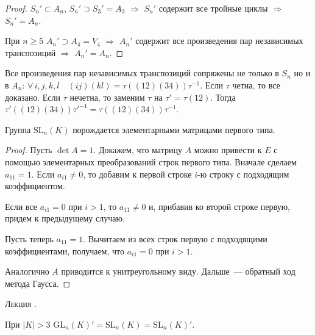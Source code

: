 \documentclass[a4paper]{article}
\newcounter{lec}
\renewcommand{\thelec}{\Roman{lec}}
\newcommand*{\lecture}[1]{\refstepcounter{lec}\vspace{20pt}
\begin{center}{\rmfamily\textsc{Лекция \thelec. \\ \textbf{#1}}}\vspace{5pt}
\end{center}}
\begin{document}
\begin{proof}
$S_n'\subset A_n$, $S_n'\supset S_3'=A_3$ $\Rightarrow$ $S_n'$
содержит все тройные циклы $\Rightarrow$ $S_n'=A_n$.

При $n\geqslant 5$ $A_n'\supset A_4=V_4$ $\Rightarrow$ $A_n'$
содержит все произведения пар независимых транспозиций $\Rightarrow$
$A_n'=A_n$.
\end{proof}

\begin{note}
Все произведения пар независимых транспозиций сопряжены не только в
$S_n$ но и в $A_n$: $\forall \, i,j,k,l\quad
(ij)(kl)=\tau((12)(34))\tau^{-1}$. Если $\tau$ четна, то все
доказано. Если $\tau$ нечетна, то заменим $\tau$ на
$\tau'=\tau(12)$. Тогда
$\tau'((12)(34))\tau'^{-1}=\tau((12)(34))\tau^{-1}$.
\end{note}

\begin{lemma}
\label{2.IX}Группа $\mathrm{SL}_n(K)$ порождается элементарными
матрицами первого типа.
\end{lemma}

\begin{proof}
Пусть $\det A=1$. Докажем, что матрицу $A$ можно привести к $E$ с
помощью элементарных преобразований строк первого типа. Вначале
сделаем $a_{11}=1$. Если $a_{i1}\neq 0$, то добавим к первой строке
$i$-ю строку с подходящим коэффициентом.

Если все $a_{i1}=0$ при $i>1$, то $a_{11}\neq 0$ и, прибавив ко
второй строке первую, придем к предыдущему случаю.

Пусть теперь $a_{11}=1$. Вычитаем из всех строк первую с подходящими
коэффициентами, получаем, что $a_{i1}=0$ при $i>1$.

Аналогично $A$ приводится к унитреугольному виду. Дальше~---
обратный ход метода Гаусса.
\end{proof}
\lecture{}

\begin{theorem}
При $|K|>3$ $\mathrm{GL}_n(K)'=\mathrm{SL}_n(K)=\mathrm{SL}_n(K)'$.
\end{theorem}
\end{document}
